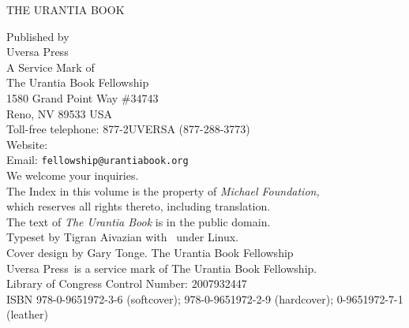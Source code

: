 \begin{center}
\booktitlefontsize THE URANTIA BOOK\\
\end{center}

\newpage

\newcommand{\sizeone}{\fontsize{9}{11}\selectfont}
\newcommand{\sizetwo}{\fontsize{15}{15}\selectfont}
\newcommand{\sizethree}{\fontsize{11}{14}\selectfont}
\newcommand{\sizefour}{\fontsize{8}{10}\selectfont}
\newcommand{\sizefive}{\fontsize{7}{7}\selectfont}

\begin{center}
\sizeone
Published by\\[3ex]
\sizetwo
Uversa Press\\
\sizeone
A Service Mark of\\[3ex]
\sizethree
The Urantia Book Fellowship\\
1580 Grand Point Way \#34743\\
Reno, NV 89533 USA\\
Toll-free telephone: 877-2UVERSA (877-288-3773)\\
Website: \\
Email: \texttt{fellowship@urantiabook.org}\\
We welcome your inquiries.\\[7ex]
\sizefour
The Index in this volume is the property of \emph{Michael Foundation,}\\
which reserves all rights thereto, including translation.\\[1ex]
The text of \emph{The Urantia Book} is in the public domain.\\[7ex]
Typeset by Tigran Aivazian with \XeLaTeX\ under Linux.\\[3ex]
Cover design by Gary Tonge.  The Urantia Book Fellowship\\[3ex]
Uversa Press\textsm\ is a service mark of The Urantia Book Fellowship.\\[9ex]
Library of Congress Control Number: 2007932447\\[2ex]
ISBN 978-0-9651972-3-6 (softcover); 978-0-9651972-2-9 (hardcover); 0-9651972-7-1 (leather)\\[2ex]

\end{center}
